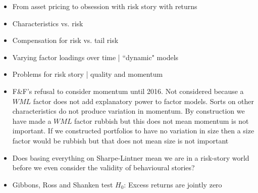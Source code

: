 \begin{itemize}
  \item From asset pricing to obsession with risk story with returns
  \item Characteristics vs. risk
  \item Compensation for risk vs. tail risk
  \item Varying factor loadings over time | ``dynamic" models
  \item Problems for risk story | quality and momentum
  \item F\&F's refusal to consider momentum until 2016. Not considered because a $WML$ 
  factor does not add explanatory power to factor models. Sorts on other characteristics
  do not produce variation in momentum. By construction we have made a $WML$ factor
  rubbish but this does not mean momentum is not important. If we constructed portfolios
  to have no variation in size then a size factor would be rubbish but that does not mean
  size is not important
  \item Does basing everything on Sharpe-Lintner mean we are in a risk-story world before
  we even consider the validity of behavioural stories?
  \item Gibbons, Ross and Shanken test $H_0$: Excess returns are jointly zero

\end{itemize}